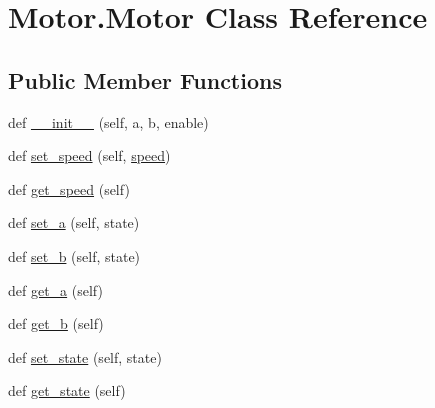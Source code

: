 \hypertarget{class_motor_1_1_motor}{}\section{Motor.\+Motor Class Reference}
\label{class_motor_1_1_motor}
\subsection*{Public Member Functions}
\begin{DoxyCompactItemize}
\item 
def \mbox{\hyperlink{class_motor_1_1_motor_aaa1c1666508649052047c99cbf697e3e}{\+\_\+\+\_\+init\+\_\+\+\_\+}} (self, a, b, enable)
\item 
def \mbox{\hyperlink{class_motor_1_1_motor_a77fe4c03a7048d04172fcfca50c42e1d}{set\+\_\+speed}} (self, \mbox{\hyperlink{class_motor_1_1_motor_a73455a68e45e155c7709d1b4ec2005d6}{speed}})
\item 
def \mbox{\hyperlink{class_motor_1_1_motor_ab3b1ca0e2439d9c0f5e7c19396cac926}{get\+\_\+speed}} (self)
\item 
def \mbox{\hyperlink{class_motor_1_1_motor_a5f3b324d2803fdf965e0f4cdd5872ca6}{set\+\_\+a}} (self, state)
\item 
def \mbox{\hyperlink{class_motor_1_1_motor_a6b6473652d46b14568ba27f4b927d715}{set\+\_\+b}} (self, state)
\item 
def \mbox{\hyperlink{class_motor_1_1_motor_a24ce933b59d15a3cb77aae0dac6c8976}{get\+\_\+a}} (self)
\item 
def \mbox{\hyperlink{class_motor_1_1_motor_a606b32b1ddc5872693a482769e8e0efa}{get\+\_\+b}} (self)
\item 
def \mbox{\hyperlink{class_motor_1_1_motor_a43d6487962d166187b7c877d8dd87a40}{set\+\_\+state}} (self, state)
\item 
def \mbox{\hyperlink{class_motor_1_1_motor_a5aeb33b843755f7e96bc037afdd6794b}{get\+\_\+state}} (self)
\end{DoxyCompactItemize}

